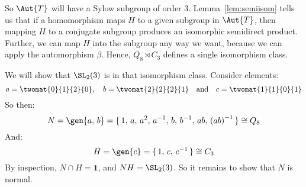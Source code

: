 \begin{enumerate}
        So \(\Aut{T}\) will have a Sylow subgroup of order 3.
        Lemma~\ref{lem:semiisom} tells us that if a homomorphism maps \(H\) to a given subgroup in \(\Aut{T}\), then
        mapping \(H\) to a conjugate subgroup produces an isomorphic semidirect product.
        Further, we can map \(H\) into the subgroup any way we want, because we can apply the automorphism \(\beta\).
        Hence, \(Q_8 \rtimes C_3\) defines a single isomorphism class.

        We will show that \(\SL_2(3)\) is in that isomorphism class.
        Consider elements:
        \[a = \twomat{0}{1}{2}{0}, \quad b = \twomat{2}{2}{2}{1} \quad \text{and} \quad c = \twomat{1}{1}{0}{1}\]
        So then:
        \[N = \gen{a,\,b} = \{\,1,\, a,\, a^2,\, a^{-1},\, b,\, b^{-1},\, ab,\, {(ab)}^{-1}\,\} \cong Q_8\]
        And:
        \[H = \gen{c} = \{\,1,\, c,\, c^{-1}\,\} \cong C_3\]
        By inspection, \(N \cap H = \bm{1}\), and \(NH = \SL_2(3)\).
        So it remains to show that \(N\) is normal.
\end{enumerate}


